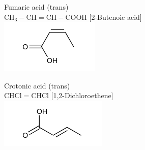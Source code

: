 \documentclass[10pt]{article}
\begin{document}
Fumaric acid (trans)\\
$\mathrm{CH}_{3}-\mathrm{CH}=\mathrm{CH}-\mathrm{COOH}$ [2-Butenoic acid]\\
\includegraphics{smile-a124cc869744a6476f3747f384aa0460f63f0546}

Crotonic acid (trans)\\
$\mathrm{CHCl}=\mathrm{CHCl}$ [1,2-Dichloroethene]\\
\includegraphics{smile-67c3c80f48bf62d51375b5859f62a4be24b7e08d}
\end{document}
